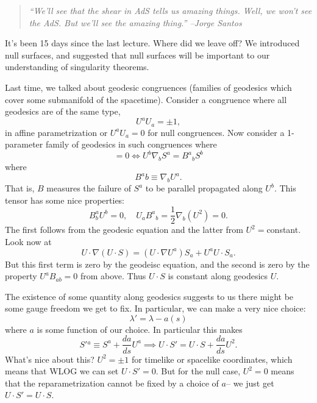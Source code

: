 \begin{quote}
    \textit{``We'll see that the shear in AdS tells us amazing things. Well, we won't see the AdS. But we'll see the amazing thing.'' --Jorge Santos}
\end{quote}
It's been 15 days since the last lecture. Where did we leave off? We introduced null surfaces, and suggested that null surfaces will be important to our understanding of singularity theorems.

Last time, we talked about geodesic congruences (families of geodesics which cover some submanifold of the spacetime). Consider a congruence where all geodesics are of the same type,
\begin{equation*}
    U^a U_a = \pm 1,
\end{equation*}
in affine parametrization or $U^a U_a =0$ for null congruences.
Now consider a 1-parameter family of geodesics in such congruences where
\begin{equation}
    [S,U]=0\iff U^b \nabla_b S^a = B^a{}_b S^b
\end{equation}
where
\begin{equation}
    B^a{}b \equiv \nabla_b U^a.
\end{equation}
That is, $B$ measures the failure of $S^a$ to be parallel propagated along $U^b$. This tensor has some nice properties:
\begin{equation}
    B^a_b U^b =0, \quad U_a B^a{}_b = \frac{1}{2} \nabla_b(U^2)=0.
\end{equation}
The first follows from the geodesic equation and the latter from $U^2=$constant. Look now at
\begin{equation}
     U\cdot \nabla(U\cdot S) = (U\cdot \nabla U^a) S_a + U^a U\cdot S_a.
\end{equation}
But this first term is zero by the geodeisc equation, and the second is zero by the property $U^a B_{ab}=0$ from above. Thus $U\cdot S$ is constant along geodesics $U$.

The existence of some quantity along geodesics suggests to us there might be some gauge freedom we get to fix. In particular, we can make a very nice choice:
\begin{equation}
    \lambda'=\lambda - a(s)
\end{equation}
where $a$ is some function of our choice. In particular this makes
\begin{equation}
    S'{}^a\equiv S^a +\frac{da}{ds} U^a \implies U\cdot S'=U\cdot S +\frac{da}{ds}U^2.
\end{equation}
What's nice about this? $U^2=\pm 1$ for timelike or spacelike coordinates, which means that WLOG we can set $U\cdot S'=0$. But for the null case, $U^2=0$ means that the reparametrization cannot be fixed by a choice of $a$-- we just get $U\cdot S'=U\cdot S$.

